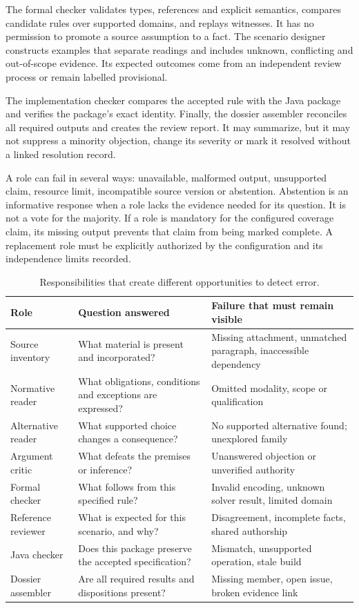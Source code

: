 The formal checker validates types, references and explicit semantics, compares
candidate rules over supported domains, and replays witnesses. It has no
permission to promote a source assumption to a fact. The scenario designer
constructs examples that separate readings and includes unknown, conflicting and
out-of-scope evidence. Its expected outcomes come from an independent review
process or remain labelled provisional.

The implementation checker compares the accepted rule with the Java package and
verifies the package's exact identity. Finally, the dossier assembler reconciles
all required outputs and creates the review report. It may summarize, but it may
not suppress a minority objection, change its severity or mark it resolved without
a linked resolution record.

A role can fail in several ways: unavailable, malformed output, unsupported
claim, resource limit, incompatible source version or abstention. Abstention is
an informative response when a role lacks the evidence needed for its question.
It is not a vote for the majority. If a role is mandatory for the configured
coverage claim, its missing output prevents that claim from being marked complete.
A replacement role must be explicitly authorized by the configuration and its
independence limits recorded.

\begin{table}[htbp]
\centering\small
\caption{Responsibilities that create different opportunities to detect error.}
\label{tab:ensemble-roles}
\begin{tabularx}{\textwidth}{P{31mm}YY}
\toprule
Role & Question answered & Failure that must remain visible\\
\midrule
Source inventory & What material is present and incorporated? & Missing attachment, unmatched paragraph, inaccessible dependency\\
Normative reader & What obligations, conditions and exceptions are expressed? & Omitted modality, scope or qualification\\
Alternative reader & What supported choice changes a consequence? & No supported alternative found; unexplored family\\
Argument critic & What defeats the premises or inference? & Unanswered objection or unverified authority\\
Formal checker & What follows from this specified rule? & Invalid encoding, unknown solver result, limited domain\\
Reference reviewer & What is expected for this scenario, and why? & Disagreement, incomplete facts, shared authorship\\
Java checker & Does this package preserve the accepted specification? & Mismatch, unsupported operation, stale build\\
Dossier assembler & Are all required results and dispositions present? & Missing member, open issue, broken evidence link\\
\bottomrule
\end{tabularx}
\end{table}


